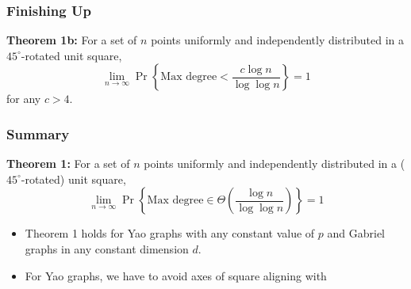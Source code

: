 \documentclass{beamer}
\begin{document}
\frame
{
  \frametitle{Finishing Up}


       \textbf{Theorem 1b:}
           For a set of $n$ points uniformly and independently distributed
		in a $45^\circ$-rotated unit square, 
           \[\lim_{n\rightarrow\infty}
              \Pr\left\{\mbox{Max degree} < \frac{c\log
n}{\log\log n}\right\} = 1 \]
           for any $c > 4$.

}

\frame
{
  \frametitle{Summary}

    \textbf{Theorem 1:}
     For a set of $n$ points uniformly and independently distributed
		in a ($45^\circ$-rotated) unit square, 
     \[\lim_{n\rightarrow\infty}
         \Pr\left\{\mbox{Max degree} 
           \in \Theta\left(\frac{\log n}{\log\log n}\right)\right\} = 1 
     \]

    \begin{itemize}
      \item Theorem 1 holds for Yao graphs with any constant value of $p$
         and Gabriel graphs in any constant dimension $d$.
      \item For Yao graphs, we have to avoid axes of square aligning with
    \end{itemize}


}
\end{document}
